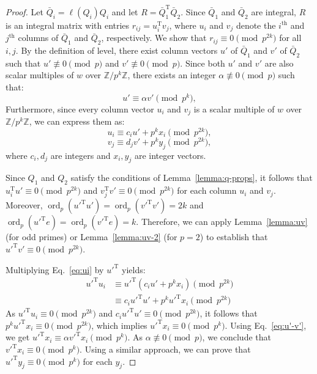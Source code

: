 \documentclass[10pt,a4paper]{amsart}
\newcommand{\trans}{^{\mathrm{T}}}
\begin{document}
\begin{proof}
Let $\bar{Q}_i=\ell(Q_i)Q_i$ and let $R = \bar{Q}_1\trans \bar{Q}_2$. Since $\bar{Q}_1$ and $\bar{Q}_2$ are integral, $R$ is an integral matrix with entries $r_{ij} = u_i\trans v_j$, where $u_i$ and $v_j$ denote the $i^\text{th}$ and $j^\text{th}$ columns of $\bar{Q}_1$ and $\bar{Q}_2$, respectively. We show that $r_{ij} \equiv 0 \pmod{p^{2k}}$ for all $i, j$. By the definition of level, there exist column vectors $u'$ of $\bar{Q}_1$ and $v'$ of $\bar{Q}_2$ such that $u' \not\equiv 0 \pmod{p}$ and $v' \not\equiv 0 \pmod{p}$. Since both $u'$ and $v'$ are also scalar multiples of $w$ over $\mathbb{Z}/p^k\mathbb{Z}$, there exists an integer $\alpha \not\equiv 0\pmod{p}$ such that:
\begin{equation}
\label{eq:u'-v'}
u' \equiv \alpha v' \pmod{p^{k}},
\end{equation}
Furthermore, since every column vector $u_i$ and $v_j$ is a scalar multiple of $w$ over $\mathbb{Z}/p^k\mathbb{Z}$, we can express them as:
\begin{equation}
\label{eq:ui}
u_i \equiv c_i u' + p^{k}x_i \pmod{p^{2k}},
\end{equation}
\begin{equation}
\label{eq:vi}
v_j \equiv d_j v' + p^{k}y_j \pmod{p^{2k}},
\end{equation}
where $c_i, d_j$ are integers and $x_i, y_j$ are integer vectors.

Since $Q_1$ and $Q_2$ satisfy the conditions of Lemma~\ref{lemma:q-props}, it follows that $u_i\trans u' \equiv 0 \pmod{p^{2k}}$ and $v_j\trans v' \equiv 0\pmod{p^{2k}}$ for each column $u_i$ and $v_j$. Moreover, $\operatorname{ord}_p({u'}\trans u') = \operatorname{ord}_p({v'}\trans v') = 2k$ and $\operatorname{ord}_p({u'}\trans e) = \operatorname{ord}_p({v'}\trans e) = k$. Therefore, we can apply Lemma~\ref{lemma:uv} (for odd primes) or Lemma~\ref{lemma:uv-2} (for $p=2$) to establish that ${u'}\trans v' \equiv 0 \pmod{p^{2k}}$.

Multiplying Eq.~\eqref{eq:ui} by ${u'}\trans$ yields:
\begin{align*}
{u'}\trans u_i &\equiv {u'}\trans (c_i u' + p^{k}x_i) \pmod{p^{2k}} \\
&\equiv c_i {u'}\trans u' + p^{k}{u'}\trans x_i \pmod{p^{2k}}
\end{align*}
As ${u'}\trans u_i \equiv 0 \pmod{p^{2k}}$ and $c_i {u'}\trans u' \equiv 0 \pmod{p^{2k}}$, it follows that $p^{k} {u'}\trans x_i \equiv 0 \pmod{p^{2k}}$, which implies ${u'}\trans x_i \equiv 0 \pmod{p^{k}}$. Using Eq.~\eqref{eq:u'-v'}, we get ${u'}\trans x_i \equiv \alpha {v'}\trans x_i \pmod{p^{k}}$. As $\alpha \not\equiv 0 \pmod{p}$, we conclude that ${v'}\trans x_i \equiv 0 \pmod{p^{k}}$. Using a similar approach, we can prove that ${u'}\trans y_j \equiv 0 \pmod{p^{k}}$ for each $y_j$.


\end{proof}
\end{document}
